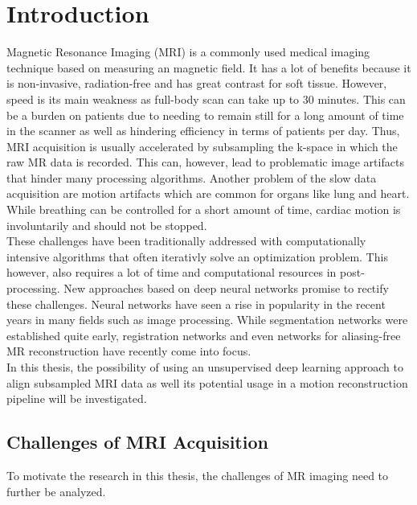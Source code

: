 
\chapter{Introduction} \label{Ch:Introduction}
Magnetic Resonance Imaging (MRI) is a commonly used medical imaging technique based on measuring an magnetic field. It has a lot of benefits because it is non-invasive, radiation-free and has great contrast for soft tissue. However, speed is its main weakness as full-body scan can take up to 30 minutes. This can be a burden on patients due to needing to remain still for a long amount of time in the scanner as well as hindering efficiency in terms of patients per day. Thus, MRI acquisition is usually accelerated by subsampling the k-space in which the raw MR data is recorded. This can, however, lead to problematic image artifacts that hinder many processing algorithms. Another problem of the slow data acquisition are motion artifacts which are common for organs like lung and heart. While breathing can be controlled for a short amount of time, cardiac motion is involuntarily and should not be stopped. \\
These challenges have been traditionally addressed with computationally intensive algorithms that often iterativly solve an optimization problem. This however, also requires a lot of time and computational resources in post-processing. New approaches based on deep neural networks promise to rectify these challenges. Neural networks have seen a rise in popularity in the recent years in many fields such as image processing. While segmentation networks were established quite early, registration networks and even networks for aliasing-free MR reconstruction have recently come into focus.\\
In this thesis, the possibility of using an unsupervised deep learning approach to align subsampled MRI data as well its potential usage in a motion reconstruction pipeline will be investigated.

\section{Challenges of MRI Acquisition} \label{Sec:ChallengesMRIAcquisition}
To motivate the research in this thesis, the challenges of MR imaging need to further be analyzed.

